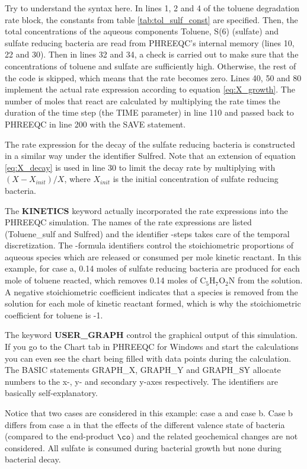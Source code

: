 Try to understand the syntax here. In lines 1, 2 and 4 of the toluene degradation rate block, the constants from table \ref{tab:tol_sulf_const} are specified. Then, the total concentrations of the aqueous components Toluene, S(6) (sulfate) and sulfate reducing bacteria are read from PHREEQC's internal memory (lines 10, 22 and 30). Then in lines 32 and 34, a check is carried out to make sure that the concentrations of toluene and sulfate are sufficiently high. Otherwise, the rest of the code is skipped, which means that the rate becomes zero. Lines 40, 50 and 80 implement the actual rate expression according to equation \ref{eq:X_growth}. The number of moles that react are calculated by multiplying the rate times the duration of the time step (the TIME parameter) in line 110 and passed back to PHREEQC in line 200 with the SAVE statement.

The rate expression for the decay of the sulfate reducing bacteria is constructed in a similar way under the identifier Sulfred. Note that an extension of equation \ref{eq:X_decay} is used in line 30 to limit the decay rate by multiplying with $(X - X_{init})/X$, where $X_{init}$ is the initial concentration of sulfate reducing bacteria.

The \textbf{KINETICS} keyword actually incorporated the rate expressions into the PHREEQC simulation. The names of the rate expressions are listed (Toluene\_sulf and Sulfred) and the identifier -steps takes care of the temporal discretization. The -formula identifiers control the stoichiometric proportions of aqueous species which are released or consumed per mole kinetic reactant. In this example, for case a, 0.14 moles of sulfate reducing bacteria are produced for each mole of toluene reacted, which removes 0.14 moles of $\text{C}_5\text{H}_7\text{O}_2\text{N}$ from the solution. A negative stoichiometric coefficient indicates that a species is removed from the solution for each mole of kinetic reactant formed, which is why the stoichiometric coefficient for toluene is -1.

The keyword \textbf{USER\_GRAPH} control the graphical output of this simulation. If you go to the Chart tab in PHREEQC for Windows and start the calculations you can even see the chart being filled with data points during the calculation. The BASIC statements GRAPH\_X, GRAPH\_Y and GRAPH\_SY allocate numbers to the x-, y- and secondary y-axes respectively. The identifiers are basically self-explanatory.

Notice that two cases are considered in this example: case a and case b. Case b differs from case a in that the effects of the different valence state of bacteria (compared to the end-product $\co$) and the related geochemical changes are not considered. All sulfate is consumed during bacterial growth but none during bacterial decay.

